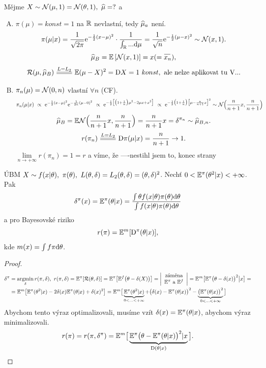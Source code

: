 \begin{remark}
	Mějme $X\sim\mathcal{N}(\mu,1)=\mathcal{N}(\theta,1),~\widehat{\mu}=?$ a\begin{enumerate}[A)]
		\item $\pi(\mu)=konst=1$ na $\mathbb{R}$ nevlastní, tedy $\widehat{\mu}_a$ není. $$\pi(\mu|x)=\frac{1}{\sqrt{2\pi}}\mathrm{e}^{-\frac{1}{2}(x-\mu)^2}\cdot \frac{1}{\int_{\mathbb{R}}...\mathrm{d}\mu}=\frac{1}{\sqrt{n}}\mathrm{e}^{-\frac{1}{2}(\mu-x)^2}\sim\mathcal{N}(x,1).$$
		$$\widehat{\mu}_B=\EE{\NN(x,1)}=x(=\oxnn),$$
		$$ \RF(\mu,\widehat{\mu}_B)\equal{L=L_2}\E(\mu-X)^2=\D X=1~konst,\text{ ale nelze aplikovat tu V...}$$
		\item $\pi_n(\mu)=\mathcal{N}(0,n)$ vlastní $\forall n$ (CF).
		\[
		\begin{split}
		\pi_n(\mu|x)~\propto~ \mathrm{e}^{-\frac{1}{2}(x-\mu)^2}\mathrm{e}^{-\frac{1}{2n}(\mu-0)^2}~\propto~\mathrm{e}^{-\frac{1}{2}\big[\big(1+\frac{1}{n}\big)\mu^2-2\mu x+x^2\big]}~\propto~\mathrm{e}^{-\frac{1}{2}\big(1+\frac{1}{n}\big)\big[\mu-\frac{n}{n+1}x\big]^2}\sim \mathcal{N}\Big(\frac{n}{n+1}x,\frac{n}{n+1}\Big)
		\end{split}
		\]
		$$\widehat{\mu}_B=\mathbb{E} \mathcal{N}\Big(\frac{n}{n+1}x,\frac{n}{n+1}\Big)=\frac{n}{n+1}x=\delta^{\pi_n}\sim\widehat{\mu}_{B,n}.$$
		$$r(\pi_n)\equal{L=L_2}\D \pi(\mu|x)=\frac{n}{n+1}\to1.$$
		$\lim\limits_{n\to+\infty}r(\pi_n)=1=r$ a víme, že 
		----nestihl jsem to, konec strany
	\end{enumerate}
\end{remark}
\begin{theorem}[Vyhazovací]
	ÚBM $X\sim f(x|\theta),~\pi(\theta),~L(\theta,\delta)=L_2(\theta,\delta)=(\theta,\delta)^2$. Nechť $0<\mathbb{E}^\pi(\theta^2|x)<+\infty$. Pak $$\delta^\pi(x)=\mathbb{E}^\pi(\theta|x)=\frac{\int\theta f(x|\theta)\pi(\theta)\mathrm{d}\theta}{\int f(x|\theta)\pi(\theta)\mathrm{d}\theta}$$
	a pro Bayesovské riziko 
	$$r(\pi)=\mathbb{E}^m[\mathrm{D}^\pi(\theta|x)],$$
	kde $m(x)=\int f\pi\mathrm{d}\theta$.
	\begin{proof}
		\[
		\begin{split}
		\delta^\pi&=\mathop{\mathrm{argmin}}\limits_{\delta} r(\pi,\delta),~r(\pi,\delta)=\mathbb{E}^\pi[\mathcal{R}(\theta,\delta)]=\mathbb{E}^\pi\big[\mathbb{E}^f\big(\theta-\delta(X)\big)\big]=\left|\begin{array}{c}
		\text{záměna} \\ \mathbb{E}^\pi\text{ a }\mathbb{E}^f		
		\end{array}
		\right|=\mathbb{E}^m\big[\mathbb{E}^\pi\big(\theta-\delta(x)\big)^2\big|x\big]=\\&=\mathbb{E}^m\big[\mathbb{E}^\pi(\theta^2|x)-2\delta(x)\mathbb{E}^\pi(\theta|x)+\delta(x)^2\big]=\mathbb{E}^m\big[\underbrace{\mathbb{E}^\pi(\theta^2|x)}_{0<...<+\infty}+\big(\delta(x)-\mathbb{E}^\pi(\theta|x)\big)^2-\underbrace{\big(\mathbb{E}^\pi(\theta|x)\big)^2}_{0<...<+\infty}\big]
		\end{split}
		\] Abychom tento výraz optimalizovali, musíme vzít $\delta(x)=\mathbb{E}^\pi(\theta|x)$, abychom výraz minimalizovali.
		$$ r(\pi)=r(\pi,\delta^\pi)=\mathbb{E}^m\big[\underbrace{\mathbb{E}^\pi\big(\theta-\mathbb{E}^\pi(\theta|x)\big)^2|x}_{\mathrm{D}(\theta|x)}\big].$$
	\end{proof}
\end{theorem}

